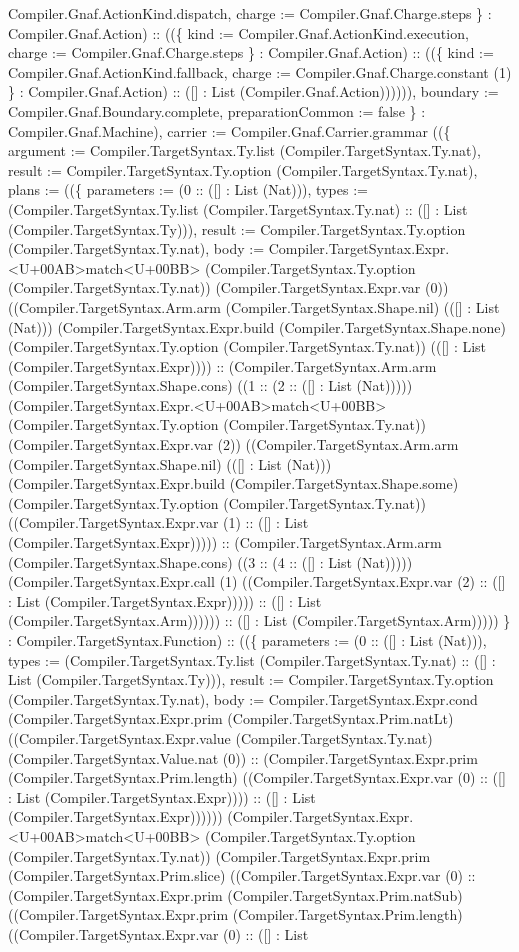 \documentclass[11pt]{article}
\begin{document}
Compiler.Gnaf.ActionKind.dispatch, charge := Compiler.Gnaf.Charge.steps \} : Compiler.Gnaf.Action) :: ((\{ kind := Compiler.Gnaf.ActionKind.execution, charge := Compiler.Gnaf.Charge.steps \} : Compiler.Gnaf.Action) :: ((\{ kind := Compiler.Gnaf.ActionKind.fallback, charge := Compiler.Gnaf.Charge.constant (1) \} : Compiler.Gnaf.Action) :: ([] : List (Compiler.Gnaf.Action)))))), boundary := Compiler.Gnaf.Boundary.complete, preparationCommon := false \} : Compiler.Gnaf.Machine), carrier := Compiler.Gnaf.Carrier.grammar ((\{ argument := Compiler.TargetSyntax.Ty.list (Compiler.TargetSyntax.Ty.nat), result := Compiler.TargetSyntax.Ty.option (Compiler.TargetSyntax.Ty.nat), plans := ((\{ parameters := (0 :: ([] : List (Nat))), types := (Compiler.TargetSyntax.Ty.list (Compiler.TargetSyntax.Ty.nat) :: ([] : List (Compiler.TargetSyntax.Ty))), result := Compiler.TargetSyntax.Ty.option (Compiler.TargetSyntax.Ty.nat), body := Compiler.TargetSyntax.Expr.<U+00AB>match<U+00BB> (Compiler.TargetSyntax.Ty.option (Compiler.TargetSyntax.Ty.nat)) (Compiler.TargetSyntax.Expr.var (0)) ((Compiler.TargetSyntax.Arm.arm (Compiler.TargetSyntax.Shape.nil) (([] : List (Nat))) (Compiler.TargetSyntax.Expr.build (Compiler.TargetSyntax.Shape.none) (Compiler.TargetSyntax.Ty.option (Compiler.TargetSyntax.Ty.nat)) (([] : List (Compiler.TargetSyntax.Expr)))) :: (Compiler.TargetSyntax.Arm.arm (Compiler.TargetSyntax.Shape.cons) ((1 :: (2 :: ([] : List (Nat))))) (Compiler.TargetSyntax.Expr.<U+00AB>match<U+00BB> (Compiler.TargetSyntax.Ty.option (Compiler.TargetSyntax.Ty.nat)) (Compiler.TargetSyntax.Expr.var (2)) ((Compiler.TargetSyntax.Arm.arm (Compiler.TargetSyntax.Shape.nil) (([] : List (Nat))) (Compiler.TargetSyntax.Expr.build (Compiler.TargetSyntax.Shape.some) (Compiler.TargetSyntax.Ty.option (Compiler.TargetSyntax.Ty.nat)) ((Compiler.TargetSyntax.Expr.var (1) :: ([] : List (Compiler.TargetSyntax.Expr))))) :: (Compiler.TargetSyntax.Arm.arm (Compiler.TargetSyntax.Shape.cons) ((3 :: (4 :: ([] : List (Nat))))) (Compiler.TargetSyntax.Expr.call (1) ((Compiler.TargetSyntax.Expr.var (2) :: ([] : List (Compiler.TargetSyntax.Expr))))) :: ([] : List (Compiler.TargetSyntax.Arm)))))) :: ([] : List (Compiler.TargetSyntax.Arm))))) \} : Compiler.TargetSyntax.Function) :: ((\{ parameters := (0 :: ([] : List (Nat))), types := (Compiler.TargetSyntax.Ty.list (Compiler.TargetSyntax.Ty.nat) :: ([] : List (Compiler.TargetSyntax.Ty))), result := Compiler.TargetSyntax.Ty.option (Compiler.TargetSyntax.Ty.nat), body := Compiler.TargetSyntax.Expr.cond (Compiler.TargetSyntax.Expr.prim (Compiler.TargetSyntax.Prim.natLt) ((Compiler.TargetSyntax.Expr.value (Compiler.TargetSyntax.Ty.nat) (Compiler.TargetSyntax.Value.nat (0)) :: (Compiler.TargetSyntax.Expr.prim (Compiler.TargetSyntax.Prim.length) ((Compiler.TargetSyntax.Expr.var (0) :: ([] : List (Compiler.TargetSyntax.Expr)))) :: ([] : List (Compiler.TargetSyntax.Expr)))))) (Compiler.TargetSyntax.Expr.<U+00AB>match<U+00BB> (Compiler.TargetSyntax.Ty.option (Compiler.TargetSyntax.Ty.nat)) (Compiler.TargetSyntax.Expr.prim (Compiler.TargetSyntax.Prim.slice) ((Compiler.TargetSyntax.Expr.var (0) :: (Compiler.TargetSyntax.Expr.prim (Compiler.TargetSyntax.Prim.natSub) ((Compiler.TargetSyntax.Expr.prim (Compiler.TargetSyntax.Prim.length) ((Compiler.TargetSyntax.Expr.var (0) :: ([] : List 
\end{document}
